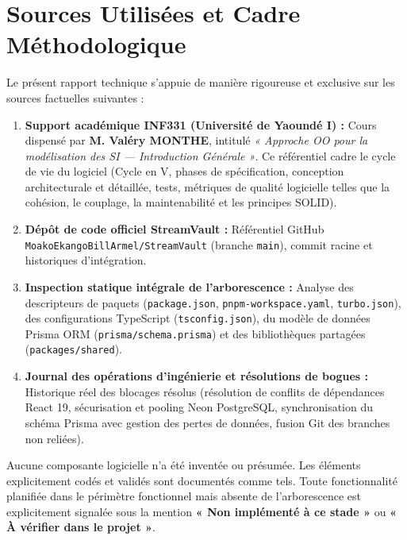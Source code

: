 \documentclass[11pt,a4paper]{article}
\begin{document}
\tableofcontents
\newpage

\section{Sources Utilisées et Cadre Méthodologique}

Le présent rapport technique s'appuie de manière rigoureuse et exclusive sur les sources factuelles suivantes :
\begin{enumerate}
    \item \textbf{Support académique INF331 (Université de Yaoundé I) :} Cours dispensé par \textbf{M. Valéry MONTHE}, intitulé \emph{« Approche OO pour la modélisation des SI — Introduction Générale »}. Ce référentiel cadre le cycle de vie du logiciel (Cycle en V, phases de spécification, conception architecturale et détaillée, tests, métriques de qualité logicielle telles que la cohésion, le couplage, la maintenabilité et les principes SOLID).
    \item \textbf{Dépôt de code officiel StreamVault :} Référentiel GitHub \texttt{MoakoEkangoBillArmel/StreamVault} (branche \texttt{main}), commit racine et historiques d'intégration.
    \item \textbf{Inspection statique intégrale de l'arborescence :} Analyse des descripteurs de paquets (\texttt{package.json}, \texttt{pnpm-workspace.yaml}, \texttt{turbo.json}), des configurations TypeScript (\texttt{tsconfig.json}), du modèle de données Prisma ORM (\texttt{prisma/schema.prisma}) et des bibliothèques partagées (\texttt{packages/shared}).
    \item \textbf{Journal des opérations d'ingénierie et résolutions de bogues :} Historique réel des blocages résolus (résolution de conflits de dépendances React 19, sécurisation et pooling Neon PostgreSQL, synchronisation du schéma Prisma avec gestion des pertes de données, fusion Git des branches non reliées).
\end{enumerate}

\begin{infoBox}
Aucune composante logicielle n'a été inventée ou présumée. Les éléments explicitement codés et validés sont documentés comme tels. Toute fonctionnalité planifiée dans le périmètre fonctionnel mais absente de l'arborescence est explicitement signalée sous la mention \textbf{« Non implémenté à ce stade »} ou \textbf{« À vérifier dans le projet »}.
\end{infoBox}
\end{document}
